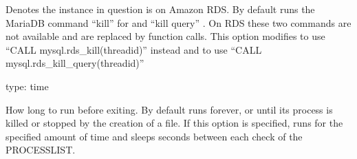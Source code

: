 \documentclass[letterpaper,10pt,english]{sphinxmanual}
\begin{document}
\begin{fulllineitems}
\label{\detokenize{mariadb-kill:cmdoption-mariadb-kill-rds}}
\sphinxAtStartPar
Denotes the instance in question is on Amazon RDS. By default  runs
the MariaDB command “kill” for {\hyperref[\detokenize{mariadb-kill:cmdoption-mariadb-kill-kill}]{}} and “kill query” {\hyperref[\detokenize{mariadb-kill:cmdoption-mariadb-kill-kill-query}]{}}.
On RDS these two commands are not available and are replaced by function calls.
This option modifies {\hyperref[\detokenize{mariadb-kill:cmdoption-mariadb-kill-kill}]{}} to use “CALL mysql.rds\_kill(thread\sphinxhyphen{}id)” instead
and {\hyperref[\detokenize{mariadb-kill:cmdoption-mariadb-kill-kill-query}]{}} to use “CALL mysql.rds\_kill\_query(thread\sphinxhyphen{}id)”

\end{fulllineitems}


\begin{fulllineitems}
\label{\detokenize{mariadb-kill:cmdoption-mariadb-kill-run-time}}
\sphinxAtStartPar
type: time

\sphinxAtStartPar
How long to run before exiting.  By default  runs forever, or until
its process is killed or stopped by the creation of a {\hyperref[\detokenize{mariadb-kill:cmdoption-mariadb-kill-sentinel}]{}} file.
If this option is specified,  runs for the specified amount of time
and sleeps {\hyperref[\detokenize{mariadb-kill:cmdoption-mariadb-kill-interval}]{}} seconds between each check of the PROCESSLIST.

\end{fulllineitems}
\end{document}

